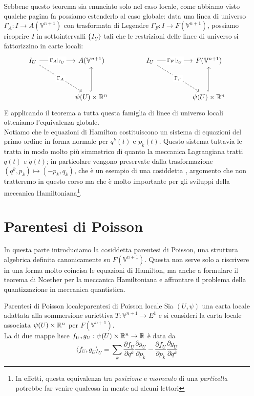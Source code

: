 \documentclass[openany]{book}
\renewcommand\V{\mathbb{V}}
\begin{document}
Sebbene questo teorema sia enunciato solo nel caso locale, come abbiamo visto qualche pagina fa possiamo estenderlo al caso globale: data una linea di universo $\Gamma_A:I\to A(\V^{n+1})$ con trasformata di Legendre $\Gamma_F:I\to F(\V^{n+1})$, possiamo ricoprire $I$ in sottointervalli $\{I_U\}$ tali che le restrizioni delle linee di universo si fattorizzino in carte locali:
\[\begin{tikzcd}
	{I_U} && {A(\V^{n+1})} && {I_U} && {F(\V^{n+1})} \\
	\\
	&& {\psi(U)\times\R^n} &&&& {\psi(U)\times \R^n}
	\arrow["{\Gamma_A|_{I_U}}"{description}, from=1-1, to=1-3]
	\arrow["{\Gamma_A}"{description}, dashed, from=1-1, to=3-3]
	\arrow["{\Gamma_F|_{I_U}}"{description}, from=1-5, to=1-7]
	\arrow["{\Gamma_F}"{description}, dashed, from=1-5, to=3-7]
	\arrow[hook, from=3-3, to=1-3]
	\arrow[hook, from=3-7, to=1-7]
\end{tikzcd}\]
E applicando il teorema a tutta questa famiglia di linee di universo locali otteniamo l'equivalenza globale.\\
Notiamo che le equazioni di Hamilton costituiscono un sistema di equazioni del primo ordine in forma normale per $q^k(t)$ e $p_k(t)$. Questo sistema tuttavia le tratta in modo molto più simmetrico di quanto la meccanica Lagrangiana tratti $q(t)$ e $\dot q(t)$; in particolare vengono preservate dalla trasformazione $(q^k,p_k)\mapsto (-p_k, q_k)$, che è un esempio di una cosiddetta , argomento che non tratteremo in questo corso ma che è molto importante per gli sviluppi della meccanica Hamiltoniana\footnote{In effetti, questa equivalenza tra \textit{posizione} e \textit{momento} di una \textit{particella} potrebbe far venire qualcosa in mente ad alcuni lettori}.\\

\newpage
\section{Parentesi di Poisson}

In questa parte introduciamo la cosiddetta parentesi di Poisson, una struttura algebrica definita canonicamente su $F(\V^{n+1})$. Questa non serve solo a riscrivere in una forma molto coincisa le equazioni di Hamilton, ma anche a formulare il teorema di Noether per la meccanica Hamiltoniana e affrontare il problema della quantizzazione in meccanica quantistica.

\begin{definition}{Parentesi di Poisson locale}{parentesi di Poisson locale}
    Sia $(U,\psi)$ una carta locale adattata alla sommersione suriettiva $T:\V^{n+1}\to E^1$ e si consideri la carta locale associata $\psi(U)\times\mathbb{R}^n$ per $F(\V^{n+1})$.\\
    La  di due mappe lisce $f_U, g_U : \psi(U)\times\mathbb{R}^n \to \mathbb{R} $ è data da 
    \[ \langle f_U, g_U\rangle_U = \sum_k \frac{ \partial f_U }{\partial q^k} \frac{\partial g_U}{\partial p_k} - \frac{\partial f_U}{\partial p_k}\frac{\partial g_U}{\partial q^k} \]
\end{definition}
\end{document}
